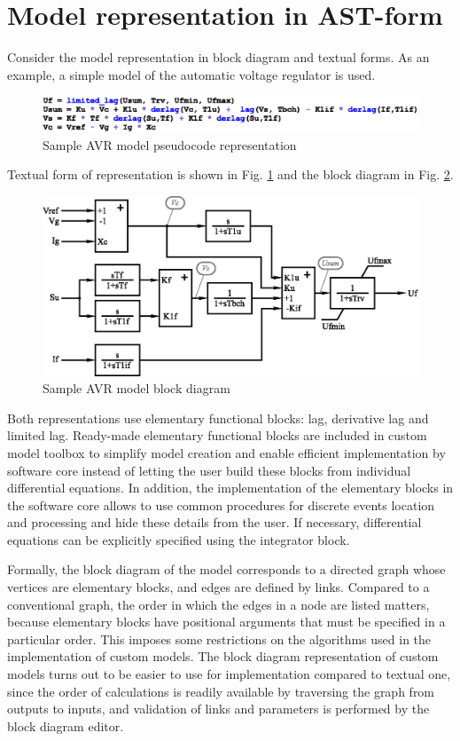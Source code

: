 \documentclass[lettersize,journal]{IEEEtran}
\begin{document}
\section{Model representation in AST-form}
Consider the model representation in block diagram and textual forms. As an example, a simple model of the automatic voltage regulator is used. 
\begin{figure}[h]
	\centering
	\includegraphics[width=\columnwidth]{code.eps}
	\caption{Sample AVR model pseudocode representation}
	\label{fig_avrcode}
\end{figure}
Textual form of representation is shown in Fig. \ref{fig_avrcode} and the block diagram in Fig. \ref{fig_avr}.
\begin{figure}[h]
	\centering
	\includegraphics[width=\columnwidth]{avr.eps}
	\caption{Sample AVR model block diagram}
	\label{fig_avr}
\end{figure}

Both representations use elementary functional blocks: lag, derivative lag and limited lag. Ready-made elementary functional
blocks are included in custom model toolbox to simplify model creation and enable efficient implementation by software core 
instead of letting the user build these blocks from individual differential equations.
In addition, the implementation of the elementary blocks in the software core allows to use common procedures for discrete events 
location and processing and hide these details from the user. 
If necessary, differential equations can be explicitly specified using the integrator block.

Formally, the block diagram of the model corresponds to a directed graph whose vertices are elementary blocks, and
edges are defined by links. Compared to a conventional graph, the order in which the edges in a node are listed matters,
because elementary blocks have positional arguments that must be specified in a particular order. This imposes some restrictions
on the algorithms used in the implementation of custom models. The block diagram representation of custom models
turns out to be easier to use for implementation compared to textual one, since the order of calculations is readily
available by traversing the graph from outputs to inputs, and validation of links and parameters is performed by the 
block diagram editor.
\end{document}
